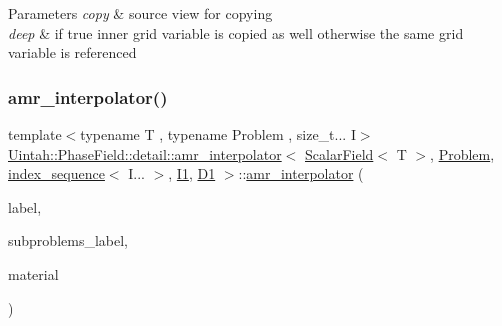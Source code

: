 \begin{DoxyParams}{Parameters}
{\em copy} & source view for copying \\
\hline
{\em deep} & if true inner grid variable is copied as well otherwise the same grid variable is referenced \\
\hline
\end{DoxyParams}
\mbox{\label{classUintah_1_1PhaseField_1_1detail_1_1amr__interpolator_3_01ScalarField_3_01T_01_4_00_01Problem71844444bc14a03c0566689b6b502040_a9c040b7f2b8029127f93431a363bc684}} 
\subsubsection{\texorpdfstring{amr\+\_\+interpolator()}{amr\_interpolator()}\hspace{0.1cm}{\footnotesize\ttfamily [2/4]}}
{\footnotesize\ttfamily template$<$typename T , typename Problem , size\+\_\+t... I$>$ \\
\hyperlink{classUintah_1_1PhaseField_1_1detail_1_1amr__interpolator}{Uintah\+::\+Phase\+Field\+::detail\+::amr\+\_\+interpolator}$<$ \hyperlink{structUintah_1_1PhaseField_1_1ScalarField}{Scalar\+Field}$<$ T $>$, \hyperlink{classUintah_1_1PhaseField_1_1Problem}{Problem}, \hyperlink{namespaceUintah_1_1PhaseField_a237de804d99512e50613aff7c94a9461}{index\+\_\+sequence}$<$ I... $>$, \hyperlink{namespaceUintah_1_1PhaseField_a547ce3002aa97fbd3ef3192a6eec8406a66f19efe774b0d2b6e5844eb2d83d305}{I1}, \hyperlink{namespaceUintah_1_1PhaseField_a12bfc68444894dffdf0cb8d9cf0cc76aa24dcc0ba6bcb45bc6f503b1b538c6809}{D1} $>$\+::\hyperlink{classUintah_1_1PhaseField_1_1detail_1_1amr__interpolator}{amr\+\_\+interpolator} (\begin{DoxyParamCaption}\item[{const typename \hyperlink{structUintah_1_1PhaseField_1_1ScalarField_a7a77875e030da64c47ce9f6c22a06959}{Field\+::label\+\_\+type} \&}]{label,  }\item[{const Var\+Label $\ast$}]{subproblems\+\_\+label,  }\item[{int}]{material }\end{DoxyParamCaption})\hspace{0.3cm}{\ttfamily [inline]}}



